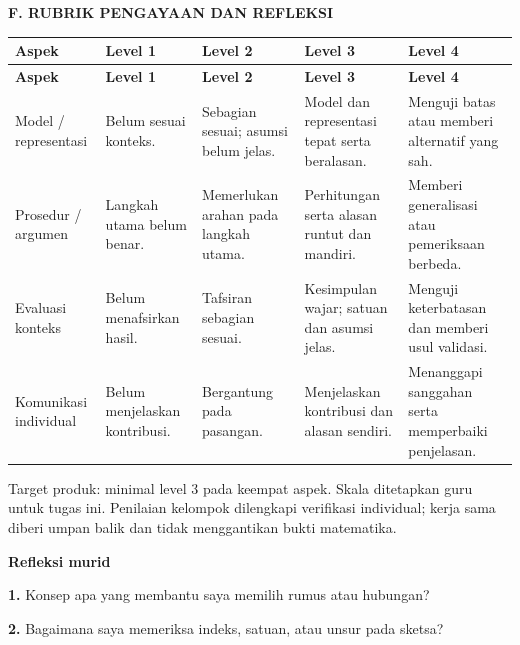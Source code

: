 \documentclass[11pt,a4paper]{article}
\begin{document}
\clearpage
\begin{center}\bfseries\large F. RUBRIK PENGAYAAN DAN REFLEKSI\end{center}\medskip
{\small\setlength{\tabcolsep}{2mm}\renewcommand{\arraystretch}{1.35}\begin{longtable}{|>{\raggedright\arraybackslash}p{27.873mm}|>{\raggedright\arraybackslash}p{26.606mm}|>{\raggedright\arraybackslash}p{29.140mm}|>{\raggedright\arraybackslash}p{35.474mm}|>{\raggedright\arraybackslash}p{38.008mm}|}\hline
\rowcolor{gray!10}\textbf{Aspek} & \textbf{Level 1} & \textbf{Level 2} & \textbf{Level 3} & \textbf{Level 4}\\ \hline
\endfirsthead
\rowcolor{gray!10}\textbf{Aspek} & \textbf{Level 1} & \textbf{Level 2} & \textbf{Level 3} & \textbf{Level 4}\\ \hline
\endhead
Model / representasi & Belum sesuai konteks. & Sebagian sesuai; asumsi belum jelas. & Model dan representasi tepat serta beralasan. & Menguji batas atau memberi alternatif yang sah.\\ \hline
Prosedur / argumen & Langkah utama belum benar. & Memerlukan arahan pada langkah utama. & Perhitungan serta alasan runtut dan mandiri. & Memberi generalisasi atau pemeriksaan berbeda.\\ \hline
Evaluasi konteks & Belum menafsirkan hasil. & Tafsiran sebagian sesuai. & Kesimpulan wajar; satuan dan asumsi jelas. & Menguji keterbatasan dan memberi usul validasi.\\ \hline
Komunikasi individual & Belum menjelaskan kontribusi. & Bergantung pada pasangan. & Menjelaskan kontribusi dan alasan sendiri. & Menanggapi sanggahan serta memperbaiki penjelasan.\\ \hline
\end{longtable}}\medskip
{\small Target produk: minimal level 3 pada keempat aspek. Skala ditetapkan guru untuk tugas ini. Penilaian kelompok dilengkapi verifikasi individual; kerja sama diberi umpan balik dan tidak menggantikan bukti matematika.\par}\medskip
\par\medskip\noindent\textbf{Refleksi murid}\par\smallskip
\noindent\textbf{1.} Konsep apa yang membantu saya memilih rumus atau hubungan?\par\vspace{6mm}
\noindent\textbf{2.} Bagaimana saya memeriksa indeks, satuan, atau unsur pada sketsa?\par\vspace{6mm}
\end{document}
